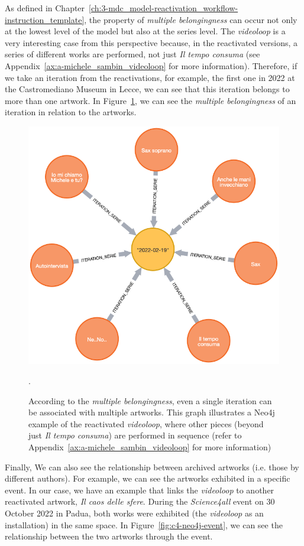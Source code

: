 As defined in Chapter~\ref{ch:3-mdc_model-reactivation_workflow-instruction_template}, the property of \textit{multiple belongingness} can occur not only at the lowest level of the model but also at the series level. The \textit{videoloop} is a very interesting case from this perspective because, in the reactivated versions, a series of different works are performed, not just \textit{Il tempo consuma} (see Appendix~\ref{ax:a-michele_sambin_videoloop} for more information). Therefore, if we take an iteration from the reactivations, for example, the first one in 2022 at the Castromediano Museum in Lecce, we can see that this iteration belongs to more than one artwork. In Figure~\ref{fig:c4-neo4j-multipleartworks}, we can see the \textit{multiple belongingness} of an iteration in relation to the artworks.

\begin{figure}[!h]
    \centering
    \includegraphics[width=0.75\linewidth]{chapters/4-MDC_model_application/image/neo4j-multipleartwork.png}
    \caption{According to the \textit{multiple belongingness}, even a single iteration can be associated with multiple artworks. This graph illustrates a Neo4j example of the reactivated \textit{videoloop}, where other pieces (beyond just \textit{Il tempo consuma}) are performed in sequence (refer to Appendix~\ref{ax:a-michele_sambin_videoloop} for more information)}.
    \label{fig:c4-neo4j-multipleartworks}
\end{figure}

Finally, We can also see the relationship between archived artworks (i.e. those by different authors). For example, we can see the artworks exhibited in a specific event. In our case, we have an example that links the \textit{videoloop} to another reactivated artwork, \textit{Il caos delle sfere}. During the \textit{Science4all} event on 30 October 2022 in Padua, both works were exhibited (the \textit{videoloop} as an installation) in the same space. In Figure~\ref{fig:c4-neo4j-event}, we can see the relationship between the two artworks through the event.

